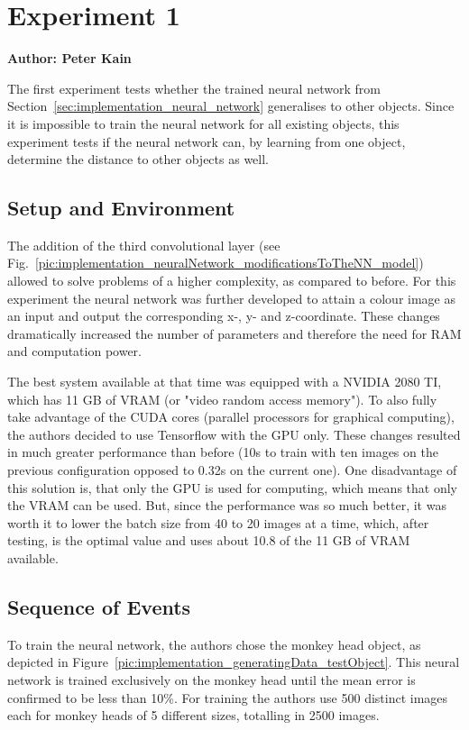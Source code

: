 \chapter{Experiment 1}
\label{cap:experiment1}

\textbf{Author: Peter Kain} 

The first experiment tests whether the trained neural network from Section~\ref{sec:implementation_neural_network} generalises to other objects. Since it is impossible to train the neural network for all existing objects, this experiment tests if the neural network can, by learning from one object, determine the distance to other objects as well.

\section{Setup and Environment}
The addition of the third convolutional layer (see Fig.~\ref{pic:implementation_neuralNetwork_modificationsToTheNN_model}) allowed to solve problems of a higher complexity, as compared to before. For this experiment the neural network was further developed to attain a colour image as an input and output the corresponding x-, y- and z-coordinate. These changes dramatically increased the number of parameters and therefore the need for RAM and computation power. 

The best system available at that time was equipped with a NVIDIA 2080 TI, which has 11 GB of VRAM (or "video random access memory"). To also fully take advantage of the CUDA cores (parallel processors for graphical computing), the authors decided to use Tensorflow with the GPU only. These changes resulted in much greater performance than before (10s to train with ten images on the previous configuration opposed to 0.32s on the current one). One disadvantage of this solution is, that only the GPU is used for computing, which means that only the VRAM can be used. But, since the performance was so much better, it was worth it to lower the batch size from 40 to 20 images at a time, which, after testing, is the optimal value and uses about 10.8 of the 11 GB of VRAM available.

\section{Sequence of Events}
To train the neural network, the authors chose the monkey head object, as depicted in Figure~\ref{pic:implementation_generatingData_testObject}. This neural network is trained exclusively on the monkey head until the mean error is confirmed to be less than 10\%. For training the authors use 500 distinct images each for monkey heads of 5 different sizes, totalling in 2500 images.

